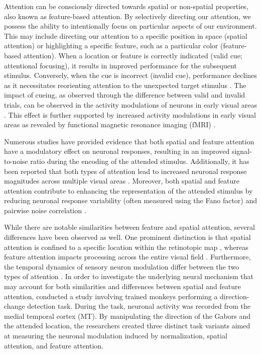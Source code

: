 Attention can be consciously directed towards spatial or non-spatial properties, also known as feature-based attention. By selectively directing our attention, we possess the ability to intentionally focus on particular aspects of our environment. This may include directing our attention to a specific position in space (spatial attention) or highlighting a specific feature, such as a particular color (feature-based attention). When a location or feature is correctly indicated (valid cue; attentional focusing), it results in improved performance for the subsequent stimulus. Conversely, when the cue is incorrect (invalid cue), performance declines as it necessitates reorienting attention to the unexpected target stimulus \citep{alanallport1971parallel,posner1980orienting,posner1987selective}. The impact of cueing, as observed through the difference between valid and invalid trials, can be observed in the activity modulations of neurons in early visual areas \citep{moran1985selective,treue1996attentional,roelfsema1998object}. This effect is further supported by increased activity modulations in early visual areas as revealed by functional magnetic resonance imaging (fMRI) \citep{o1999fmri,ungerleider2000mechanisms}.

Numerous studies have provided evidence that both spatial and feature attention have a modulatory effect on neuronal responses, resulting in an improved signal-to-noise ratio during the encoding of the attended stimulus. Additionally, it has been reported that both types of attention lead to increased neuronal response magnitudes across multiple visual areas \citep{carrasco2011visual}. Moreover, both spatial and feature attention contribute to enhancing the representation of the attended stimulus by reducing neuronal response variability (often measured using the Fano factor) and pairwise noise correlation \citep{cohen2009attention,mitchell2009spatial}. 

While there are notable similarities between feature and spatial attention, several differences have been observed as well. One prominent distinction is that spatial attention is confined to a specific location within the retinotopic map \citep{womelsdorf2006dynamic}, whereas feature attention impacts processing across the entire visual field \citep{saenz2002global}. Furthermore, the temporal dynamics of sensory neuron modulation differ between the two types of attention \citep{hayden2005time}. In order to investigate the underlying neural mechanism that may account for both similarities and differences between spatial and feature attention, \citet{ni2019neuronal} conducted a study involving trained monkeys performing a direction-change detection task. During the task, neuronal activity was recorded from the medial temporal cortex (MT). By manipulating the direction of the Gabors and the attended location, the researchers created three distinct task variants aimed at measuring the neuronal modulation induced by normalization, spatial attention, and feature attention.


